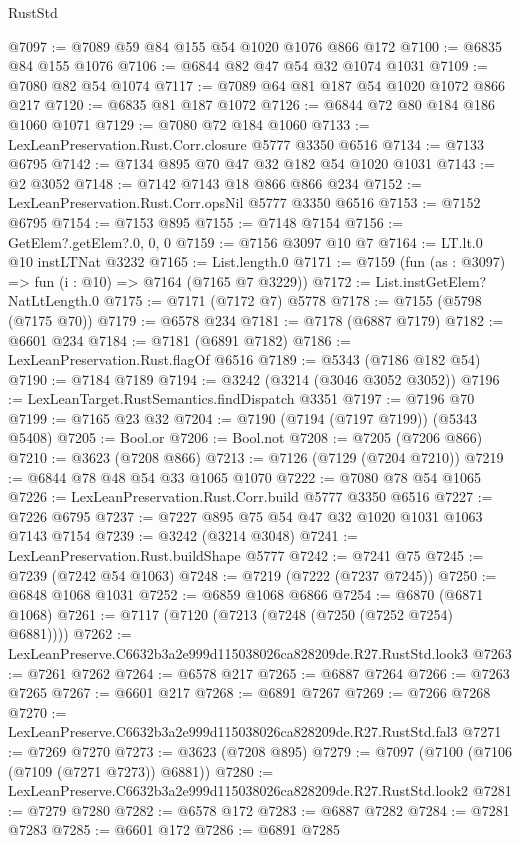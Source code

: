\begin{lexlean}{RustStd}
\begin{coremodule}
@7097 := @7089 @59 @84 @155 @54 @1020 @1076 @866 @172
@7100 := @6835 @84 @155 @1076
@7106 := @6844 @82 @47 @54 @32 @1074 @1031
@7109 := @7080 @82 @54 @1074
@7117 := @7089 @64 @81 @187 @54 @1020 @1072 @866 @217
@7120 := @6835 @81 @187 @1072
@7126 := @6844 @72 @80 @184 @186 @1060 @1071
@7129 := @7080 @72 @184 @1060
@7133 := LexLeanPreservation.Rust.Corr.closure @5777 @3350 @6516
@7134 := @7133 @6795
@7142 := @7134 @895 @70 @47 @32 @182 @54 @1020 @1031
@7143 := @2 @3052
@7148 := @7142 @7143 @18 @866 @866 @234
@7152 := LexLeanPreservation.Rust.Corr.opsNil @5777 @3350 @6516
@7153 := @7152 @6795
@7154 := @7153 @895
@7155 := @7148 @7154
@7156 := GetElem?.getElem?.{0, 0, 0}
@7159 := @7156 @3097 @10 @7
@7164 := LT.lt.{0} @10 instLTNat @3232
@7165 := List.length.{0}
@7171 := @7159 (fun (as : @3097) => fun (i : @10) => @7164 (@7165 @7 @3229))
@7172 := List.instGetElem?NatLtLength.{0}
@7175 := @7171 (@7172 @7) @5778
@7178 := @7155 (@5798 (@7175 @70))
@7179 := @6578 @234
@7181 := @7178 (@6887 @7179)
@7182 := @6601 @234
@7184 := @7181 (@6891 @7182)
@7186 := LexLeanPreservation.Rust.flagOf @6516
@7189 := @5343 (@7186 @182 @54)
@7190 := @7184 @7189
@7194 := @3242 (@3214 (@3046 @3052 @3052))
@7196 := LexLeanTarget.RustSemantics.findDispatch @3351
@7197 := @7196 @70
@7199 := @7165 @23 @32
@7204 := @7190 (@7194 (@7197 @7199)) (@5343 @5408)
@7205 := Bool.or
@7206 := Bool.not
@7208 := @7205 (@7206 @866)
@7210 := @3623 (@7208 @866)
@7213 := @7126 (@7129 (@7204 @7210))
@7219 := @6844 @78 @48 @54 @33 @1065 @1070
@7222 := @7080 @78 @54 @1065
@7226 := LexLeanPreservation.Rust.Corr.build @5777 @3350 @6516
@7227 := @7226 @6795
@7237 := @7227 @895 @75 @54 @47 @32 @1020 @1031 @1063 @7143 @7154
@7239 := @3242 (@3214 @3048)
@7241 := LexLeanPreservation.Rust.buildShape @5777
@7242 := @7241 @75
@7245 := @7239 (@7242 @54 @1063)
@7248 := @7219 (@7222 (@7237 @7245))
@7250 := @6848 @1068 @1031
@7252 := @6859 @1068 @6866
@7254 := @6870 (@6871 @1068)
@7261 := @7117 (@7120 (@7213 (@7248 (@7250 (@7252 @7254) @6881))))
@7262 := LexLeanPreserve.C6632b3a2e999d115038026ca828209de.R27.RustStd.look3
@7263 := @7261 @7262
@7264 := @6578 @217
@7265 := @6887 @7264
@7266 := @7263 @7265
@7267 := @6601 @217
@7268 := @6891 @7267
@7269 := @7266 @7268
@7270 := LexLeanPreserve.C6632b3a2e999d115038026ca828209de.R27.RustStd.fal3
@7271 := @7269 @7270
@7273 := @3623 (@7208 @895)
@7279 := @7097 (@7100 (@7106 (@7109 (@7271 @7273)) @6881))
@7280 := LexLeanPreserve.C6632b3a2e999d115038026ca828209de.R27.RustStd.look2
@7281 := @7279 @7280
@7282 := @6578 @172
@7283 := @6887 @7282
@7284 := @7281 @7283
@7285 := @6601 @172
@7286 := @6891 @7285

\end{coremodule}
\end{lexlean}
